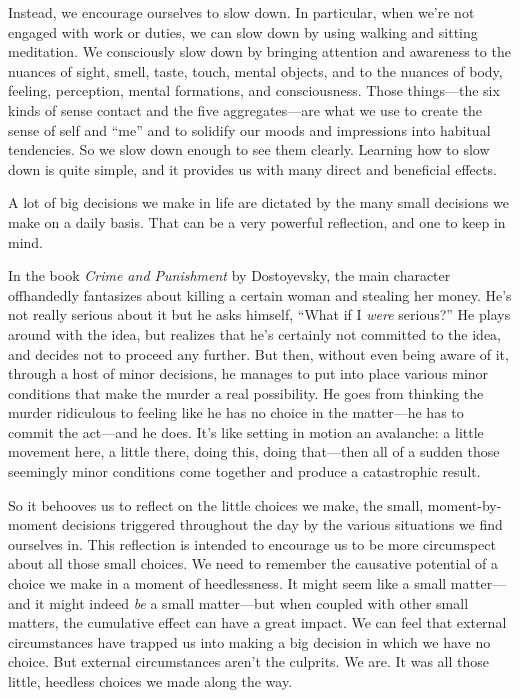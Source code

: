 Instead, we encourage ourselves to slow down. In particular, when we're 
not engaged with work or duties, we can slow down by using walking and 
sitting meditation. We consciously slow down by bringing attention and 
awareness to the nuances of sight, smell, taste, touch, mental objects, 
and to the nuances of body, feeling, perception, mental formations, and 
consciousness. Those things---the six kinds of sense contact and the 
five aggregates---are what we use to create the sense of self and 
``me'' and to solidify our moods and impressions into habitual 
tendencies. So we slow down enough to see them clearly. Learning how to 
slow down is quite simple, and it provides us with many direct and 
beneficial effects.


A lot of big decisions we make in life are dictated by the many small 
decisions we make on a daily basis. That can be a very powerful 
reflection, and one to keep in mind.

In the book \emph{Crime and Punishment} by Dostoyevsky, the main 
character offhandedly fantasizes about killing a certain woman and 
stealing her money. He's not really serious about it but he asks 
himself, ``What if I \emph{were} serious?'' He plays around with the 
idea, but realizes that he's certainly not committed to the idea, and 
decides not to proceed any further. But then, without even being aware 
of it, through a host of minor decisions, he manages to put into place 
various minor conditions that make the murder a real possibility. He 
goes from thinking the murder ridiculous to feeling like he has no 
choice in the matter---he has to commit the act---and he does. It's 
like setting in motion an avalanche: a little movement here, a little 
there, doing this, doing that---then all of a sudden those seemingly 
minor conditions come together and produce a catastrophic result.

So it behooves us to reflect on the little choices we make, the small, 
moment-by-moment decisions triggered throughout the day by the various 
situations we find ourselves in. This reflection is intended to 
encourage us to be more circumspect about all those small choices. We 
need to remember the causative potential of a choice we make in a 
moment of heedlessness. It might seem like a small matter---and it 
might indeed \emph{be} a small matter---but when coupled with other 
small matters, the cumulative effect can have a great impact. We can 
feel that external circumstances have trapped us into making a big 
decision in which we have no choice. But external circumstances aren't 
the culprits. We are. It was all those little, heedless choices we made 
along the way.

